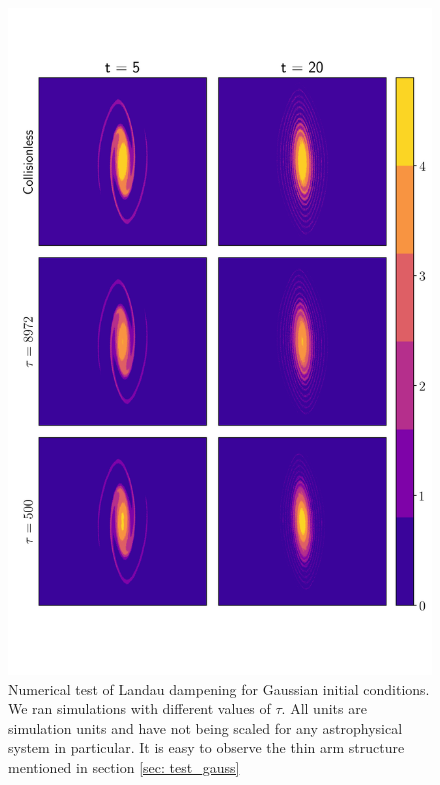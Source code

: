 \documentclass[fleqn,usenatbib]{mnras}
\begin{document}
\begin{figure}
    \centering
    \includegraphics[scale=0.8]{images/gauss.png} %
    \caption{Numerical test of Landau dampening for Gaussian initial conditions. We ran simulations with different values of $\tau$. All units are simulation units and have not being scaled for any astrophysical system in particular. It is easy to observe the thin arm structure mentioned in section \ref{sec: test_gauss}}
    \label{fig: Gauss_test}
\end{figure}
\end{document}
